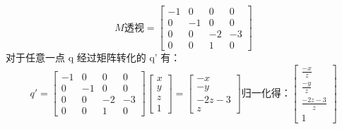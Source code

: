 $$
M透视=
\begin{bmatrix}
  -1 & 0 & 0 & 0 \\
  0 & -1 & 0 & 0 \\
  0 & 0 & -2 & -3 \\
  0 & 0 & 1 & 0
\end{bmatrix}
$$
对于任意一点 q 经过矩阵转化的 q' 有：
$$
q'= 
\begin{bmatrix}
  -1 & 0 & 0 & 0 \\
  0 & -1 & 0 & 0 \\
  0 & 0 & -2 & -3 \\
  0 & 0 & 1 & 0
\end{bmatrix}
\begin{bmatrix}
  x \\
  y \\
  z \\
  1
\end{bmatrix}
=
\begin{bmatrix}
  -x \\
  -y \\
  -2z-3 \\
  z
\end{bmatrix}
归一化得：
\begin{bmatrix}
  \frac{-x}{z} \\
  \frac{-y}{z} \\
  \frac{-2z-3}{z} \\
  1
\end{bmatrix}
$$
